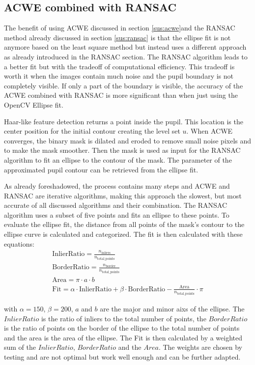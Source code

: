 \subsection{ACWE combined with RANSAC}
\label{sus:acwe_ransac}
The benefit of using ACWE discussed in section \ref{sus:acwe}and the RANSAC method already discussed in section \ref{sus:ransac} is that the ellipse fit is not anymore based on the least square method but instead uses a different approach as already introduced in the RANSAC section. The RANSAC algorithm leads to a better fit but with the tradeoff of computational efficiency. This tradeoff is worth it when the images contain much noise and the pupil boundary is not completely visible. If only a part of the boundary is visible, the accuracy of the ACWE combined with RANSAC is more significant than when just using the OpenCV Ellipse fit.

Haar-like feature detection returns a point inside the pupil. This location is the center position for the initial contour creating the level set $u$. When ACWE converges, the binary mask is dilated and eroded to remove small noise pixels and to make the mask smoother. Then the mask is used as input for the RANSAC algorithm to fit an ellipse to the contour of the mask. The parameter of the approximated pupil contour can be retrieved from the ellipse fit.

As already foreshadowed, the process contains many steps and ACWE and RANSAC are iterative algorithms, making this approach the slowest, but most accurate of all discussed algorithms and their combination. The RANSAC algorithm uses a subset of five points and fits an ellipse to these points. To evaluate the ellipse fit, the distance from all points of the mask's contour to the ellipse curve is calculated and categorized. The fit is then calculated with these equations: 
\begin{gather}
    \text{InlierRatio} = \frac{n_{\text{inliers}}}{n_{\text{total\_points}}} \\
    \text{BorderRatio} = \frac{n_{\text{border}}}{n_{\text{total\_points}}} \\
    \text{Area} = \pi \cdot a \cdot b \\
    \text{Fit} = \alpha \cdot \text{InlierRatio} + \beta \cdot \text{BorderRatio} - \frac{\text{Area}}{n_{\text{total\_points}}} \cdot \pi
\end{gather}

with $\alpha = 150$, $\beta = 200$, $a$ and $b$ are the major and minor aixs of the ellipse. The $InlierRatio$ is the ratio of inliers to the total number of points, the $BorderRatio$ is the ratio of points on the border of the ellipse to the total number of points and the area is the area of the ellipse. The Fit is then calculated by a weighted sum of the $InlierRatio$, $BorderRatio$ and the $Area$. The weights are chosen by testing and are not optimal but work well enough and can be further adapted. 

